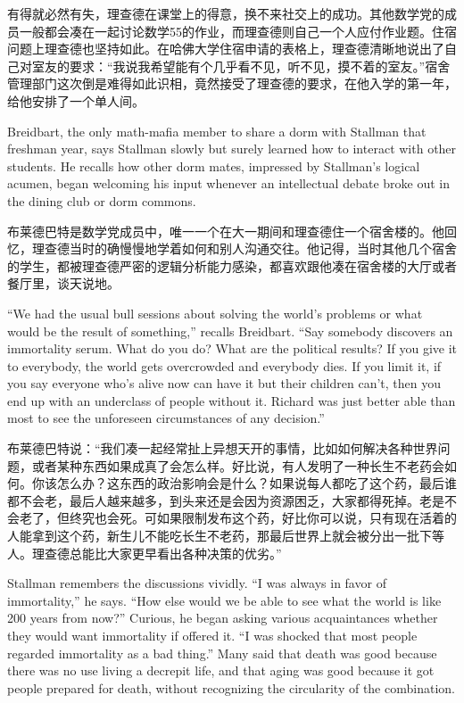 \ifdefined\chs
有得就必然有失，理查德在课堂上的得意，换不来社交上的成功。其他数学党的成员一般都会凑在一起讨论数学55的作业，而理查德则自己一个人应付作业题。住宿问题上理查德也坚持如此。在哈佛大学住宿申请的表格上，理查德清晰地说出了自己对室友的要求：“我说我希望能有个几乎看不见，听不见，摸不着的室友。”宿舍管理部门这次倒是难得如此识相，竟然接受了理查德的要求，在他入学的第一年，给他安排了一个单人间。
\fi

\ifdefined\eng
Breidbart, the only math-mafia member to share a dorm with Stallman that freshman year, says Stallman slowly but surely learned how to interact with other students. He recalls how other dorm mates, impressed by Stallman's logical acumen, began welcoming his input whenever an intellectual debate broke out in the dining club or dorm commons.
\fi

\ifdefined\chs
布莱德巴特是数学党成员中，唯一一个在大一期间和理查德住一个宿舍楼的。他回忆，理查德当时的确慢慢地学着如何和别人沟通交往。他记得，当时其他几个宿舍的学生，都被理查德严密的逻辑分析能力感染，都喜欢跟他凑在宿舍楼的大厅或者餐厅里，谈天说地。
\fi

\ifdefined\eng
``We had the usual bull sessions about solving the world's problems or what would be the result of something,'' recalls Breidbart. ``Say somebody discovers an immortality serum. What do you do? What are the political results? If you give it to everybody, the world gets overcrowded and everybody dies. If you limit it, if you say everyone who's alive now can have it but their children can't, then you end up with an underclass of people without it. Richard was just better able than most to see the unforeseen circumstances of any decision.''
\fi

\ifdefined\chs
布莱德巴特说：“我们凑一起经常扯上异想天开的事情，比如如何解决各种世界问题，或者某种东西如果成真了会怎么样。好比说，有人发明了一种长生不老药会如何。你该怎么办？这东西的政治影响会是什么？如果说每人都吃了这个药，最后谁都不会老，最后人越来越多，到头来还是会因为资源困乏，大家都得死掉。老是不会老了，但终究也会死。可如果限制发布这个药，好比你可以说，只有现在活着的人能拿到这个药，新生儿不能吃长生不老药，那最后世界上就会被分出一批下等人。理查德总能比大家更早看出各种决策的优劣。”
\fi

\ifdefined\eng
Stallman remembers the discussions vividly. ``I was always in favor of immortality,'' he says. ``How else would we be able to see what the world is like 200 years from now?'' Curious, he began asking various acquaintances whether they would want immortality if offered it. ``I was shocked that most people regarded immortality as a bad thing.'' Many said that death was good because there was no use living a decrepit life, and that aging was good because it got people prepared for death, without recognizing the circularity of the combination.
\fi

